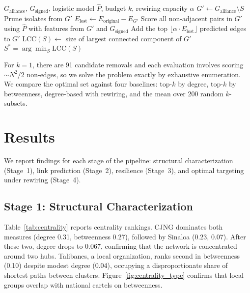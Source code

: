 \documentclass[11pt, a4paper]{article}
\begin{document}
\begin{algorithm}[H]
\caption{Optimal targeting under rewiring}\label{alg:optimal}
\begin{algorithmic}[1]
\Require $G_{\text{alliance}}$, $G_{\text{signed}}$, logistic model $\hat{P}$, budget $k$, rewiring capacity $\alpha$
    \State $G' \gets G_{\text{alliance}} \setminus S$ 
    \State Prune isolates from $G'$
    \State $E_{\text{lost}} \gets E_{\text{original}} - E_{G'}$
    \State Score all non-adjacent pairs in $G'$ using $\hat{P}$ with features from $G'$ and $G_{\text{signed}}$
    \State Add the top $\lfloor \alpha \cdot E_{\text{lost}} \rfloor$ predicted edges to $G'$
    \State $\text{LCC}(S) \gets$ size of largest connected component of $G'$
\EndFor
\State \Return $S^* = \arg\min_{S} \text{LCC}(S)$
\end{algorithmic}
\end{algorithm}

For $k = 1$, there are 91 candidate removals and each evaluation involves scoring $\sim N^2/2$ non-edges, so we solve the problem exactly by exhaustive enumeration. We compare the optimal set against four baselines: top-$k$ by degree, top-$k$ by betweenness, degree-based with rewiring, and the mean over 200 random $k$-subsets.

\section{Results}\label{sec:results}

We report findings for each stage of the pipeline: structural characterization (Stage~1), link prediction (Stage~2), resilience (Stage~3), and optimal targeting under rewiring (Stage~4).

\subsection{Stage 1: Structural Characterization}\label{sec:results_stage1}

Table~\ref{tab:centrality} reports centrality rankings. CJNG dominates both measures (degree 0.31, betweenness 0.27), followed by Sinaloa (0.23, 0.07). After these two, degree drops to 0.067, confirming that the network is concentrated around two hubs. Talibanes, a local organization, ranks second in betweenness (0.10) despite modest degree (0.04), occupying a disproportionate share of shortest paths between clusters. Figure~\ref{fig:centrality_type} confirms that local groups overlap with national cartels on betweenness.
\end{document}
